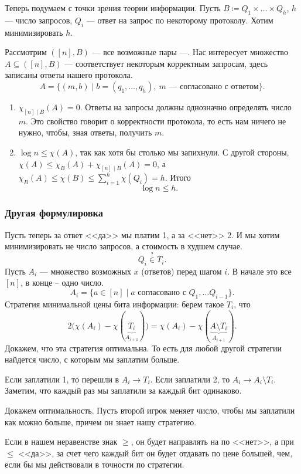 Теперь подумаем с точки зрения теории информации. Пусть $ B \coloneqq Q_1 \times \ldots \times Q_h$, $ h$ --- число запросов, $ Q_i$ --- ответ на запрос по некоторому протоколу.
Хотим минимизировать $ h$.

Рассмотрим $ ([n], B)$ --- все возможные пары ---. Нас интересует множество  $ A \subseteq ([n], B)$ --- соответствует некоторым корректным запросам, здесь записаны ответы нашего протокола.
\[
	A = \{(m, b) \mid b = (q_1, \ldots , q_h), ~ m \text{ --- согласовано с ответом}\}
.\] 

\begin{enumerate}
	\item $ \chi _{[n] \mid B}(A) = 0$. Ответы на запросы должны однозначно определять число $ m$. Это свойство говорит о корректности протокола, то есть нам ничего не нужно, чтобы, зная ответы, получить $ m$.
	\item $ \log n \le \chi(A)$, так как хотя бы столько мы запихнули. С другой стороны, $ \chi(A) \le \chi_{B}(A) + \chi_{[n] \mid B}(A) = 0$, а $ \chi_B(A) \le \chi\left( B \right) \le \sum_{i=1}^{h} \chi(Q_i) = h $. 
		Итого
		\[
		\log n \le  h
		.\] 
\end{enumerate} 

\subsubsection{Другая формулировка}
Пусть теперь за ответ <<да>> мы платим 1, а за <<нет>> 2. И мы хотим минимизировать не число запросов, а стоимость в худшем случае.
 \[
Q_i \stackrel{?}{\in} T_i
.\] 
Пусть $ A_i$ --- множество возможных $ x$ (ответов) перед шагом $ i$. В начале это все $ [n]$, в конце -- одно число.
\[
	A_i = \{a \in [n] \mid a \text{ согласовано с } Q_1, \ldots Q_{i-1}\}
.\] 
Стратегия минимальной цены бита информации: берем такое $ T_i$, что
 \[
	 2\bigl(\chi(A_i) - \chi(\underbrace{T_i}_{A_{i+1}})\bigr) = \chi(A_i) - \chi(\underbrace{A \setminus T_i}_{A_{i+1}})
.\] 
Докажем, что эта стратегия оптимальна. То есть для любой другой стратегии найдется число, с которым мы заплатим больше.

Если заплатили 1, то перешли в  $ A_i \to T_i$. Если заплатили 2, то $ A_i \to A_{i} \setminus T_i$. Заметим, что каждый раз мы заплатили за каждый бит одинаково.

Докажем оптимальность. Пусть второй игрок меняет число, чтобы мы заплатили как можно больше, причем он знает нашу стратегию.

Если в нашем неравенстве знак $ \ge $, он будет направлять на по <<нет>>, а при  $ \le$ <<да>>, за счет чего каждый бит он будет отдавать по цене большей, чем, если бы мы действовали в точности по стратегии. 

